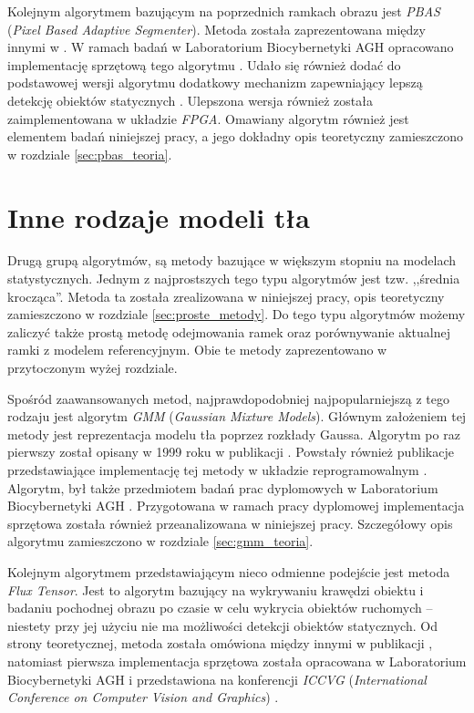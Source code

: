 Kolejnym algorytmem bazującym na poprzednich ramkach obrazu jest \textit{PBAS} (\textit{Pixel Based Adaptive Segmenter}). 
Metoda została zaprezentowana między innymi w \cite{hofmann_12}. 
W ramach badań w Laboratorium Biocybernetyki AGH opracowano implementację sprzętową tego algorytmu \cite{kryjak_13_pbas}. 
Udało się również dodać do podstawowej wersji algorytmu dodatkowy mechanizm zapewniający lepszą detekcję obiektów statycznych \cite{kryjak_14_pbas}. %
Ulepszona wersja również została zaimplementowana w układzie \textit{FPGA}. 
Omawiany algorytm również jest elementem badań niniejszej pracy, a jego dokładny opis teoretyczny zamieszczono w rozdziale \ref{sec:pbas_teoria}.

\section{Inne rodzaje modeli tła}
\label{sec:model_inne}

Drugą grupą algorytmów, są metody bazujące w większym stopniu na modelach statystycznych. Jednym z najprostszych tego typu algorytmów jest tzw. ,,średnia krocząca''. Metoda ta została zrealizowana w niniejszej pracy, opis teoretyczny zamieszczono w rozdziale \ref{sec:proste_metody}. Do tego typu algorytmów możemy zaliczyć także prostą metodę odejmowania ramek oraz porównywanie aktualnej ramki z modelem referencyjnym. Obie te metody zaprezentowano w przytoczonym wyżej rozdziale.
 
Spośród zaawansowanych metod, najprawdopodobniej najpopularniejszą z tego rodzaju jest algorytm \textit{GMM} (\textit{Gaussian Mixture Models}). 
Głównym założeniem tej metody jest reprezentacja modelu tła poprzez rozkłady Gaussa. 
Algorytm po raz pierwszy został opisany w 1999 roku w publikacji \cite{Stauffer_Grimson_99}. 
Powstały również publikacje przedstawiające implementację tej metody w układzie reprogramowalnym \cite{Genovese_Napoli_13}. 
Algorytm, był także przedmiotem badań prac dyplomowych w Laboratorium Biocybernetyki AGH \cite{janus_15, piszczek_15}. 
Przygotowana w ramach pracy dyplomowej \cite{piszczek_15} implementacja sprzętowa została również przeanalizowana w niniejszej pracy.
Szczegółowy opis algorytmu zamieszczono w rozdziale \ref{sec:gmm_teoria}.

Kolejnym algorytmem przedstawiającym nieco odmienne podejście jest metoda \textit{Flux Tensor}. 
Jest to algorytm bazujący na wykrywaniu krawędzi obiektu i badaniu pochodnej obrazu po czasie w celu wykrycia obiektów ruchomych -- niestety przy jej użyciu nie ma możliwości detekcji obiektów statycznych. 
Od strony teoretycznej, metoda została omówiona między innymi w publikacji \cite{palaniappan_11}, natomiast pierwsza implementacja sprzętowa została opracowana w Laboratorium Biocybernetyki AGH i przedstawiona na konferencji \textit{ICCVG} (\textit{International Conference on Computer Vision and Graphics}) \cite{janus_15, janus_16_flux}. %

